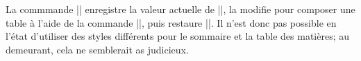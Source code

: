 \begin{noprint}
\newcommand{\shortcontents}{\@ifstar{\s@shortcontents}{\@shortcontents}}

\newcommand{\s@shortcontents}[1][0]{%
	\bgroup
		\let\contentsname=\shortcontentsname
		\cftpagenumbersoff{heading}
		\cftpagenumbersoff{subheading}
		\cftpagenumbersoff{chapter}
		\cftpagenumbersoff{section}
		\cftpagenumbersoff{subsection}
		\cftpagenumbersoff{subsubsection}
		\cftpagenumbersoff{paragraph}
		\cftpagenumbersoff{subparagraph}
		\newcounter{save@tocdepth}
		\setcounter{save@tocdepth}{\value{tocdepth}}
		\setcounter{tocdepth}{#1}
		\tableofcontents*
		\setcounter{tocdepth}{\value{save@tocdepth}}
		\clearpage
	\egroup}

\newcommand{\@shortcontents}[1][0]{%
	\bgroup
		\let\contentsname=\shortcontentsname
		\cftpagenumbersoff{heading}
		\cftpagenumbersoff{subheading}
		\cftpagenumbersoff{chapter}
		\cftpagenumbersoff{section}
		\cftpagenumbersoff{subsection}
		\cftpagenumbersoff{subsubsection}
		\cftpagenumbersoff{paragraph}
		\cftpagenumbersoff{subparagraph}
		\newcounter{save@tocdepth}
		\setcounter{save@tocdepth}{\value{tocdepth}}
		\setcounter{tocdepth}{#1}
		\tableofcontents
		\setcounter{tocdepth}{\value{save@tocdepth}}
		\clearpage
	\egroup}
\end{noprint}

\begin{developer}
La commmande |\shortcontents| enregistre la valeur actuelle de |\tocdepth|, la modifie pour composer une table à l'aide de la commande |\tableofcontents|, puis restaure |\tocdepth|. Il n'est donc pas possible en l'état d'utiliser des styles différents pour le sommaire et la table des matières; au demeurant, cela ne semblerait as judicieux.
\end{developer}


